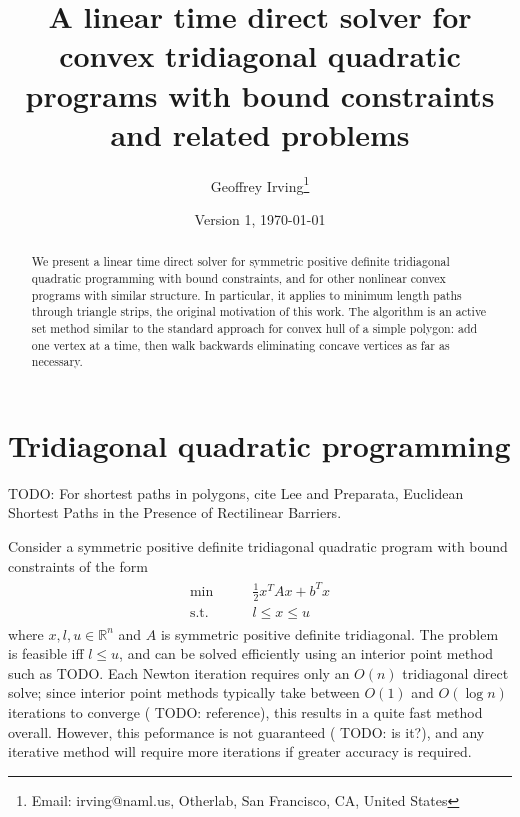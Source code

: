 \documentclass[11pt]{article}
\title{A linear time direct solver for convex tridiagonal quadratic programs with bound constraints and related problems}
\author{Geoffrey Irving\thanks{Email: irving@naml.us, Otherlab, San Francisco, CA, United States}}
\date{Version 1, \today}
\newcommand{\R}{\mathbb{R}}
\newcommand{\TODO}{{\color{red} TODO}}
\begin{document}
\maketitle

\begin{abstract}
We present a linear time direct solver for symmetric positive definite tridiagonal quadratic programming with bound constraints, and for other nonlinear convex programs with similar structure.
In particular, it applies to minimum length paths through triangle strips, the original motivation of this work.  The algorithm is an active set method similar to the standard approach for
convex hull of a simple polygon: add one vertex at a time, then walk backwards eliminating concave vertices as far as necessary.
\end{abstract}

\section{Tridiagonal quadratic programming}

\TODO: For shortest paths in polygons, cite Lee and Preparata, Euclidean Shortest Paths in the Presence of Rectilinear Barriers.

Consider a symmetric positive definite tridiagonal quadratic program with bound constraints of the form
\begin{align} \label{qp}
\begin{array}{cc}
\min          \qquad& \frac{1}{2} x^T A x + b^T x \\
\textrm{s.t.} & l \le x \le u
\end{array}
\end{align}
where $x,l,u \in \R^n$ and $A$ is symmetric positive definite tridiagonal.  The problem is feasible iff $l \le u$, and can be solved efficiently using an interior point method such as \TODO.  Each Newton iteration
requires only an $O(n)$ tridiagonal direct solve; since interior point methods typically take between $O(1)$ and $O(\log n)$ iterations to converge (\TODO: reference), this results in a quite fast method overall.
However, this peformance is not guaranteed (\TODO: is it?), and any iterative method will require more iterations if greater accuracy is required.
\end{document}
